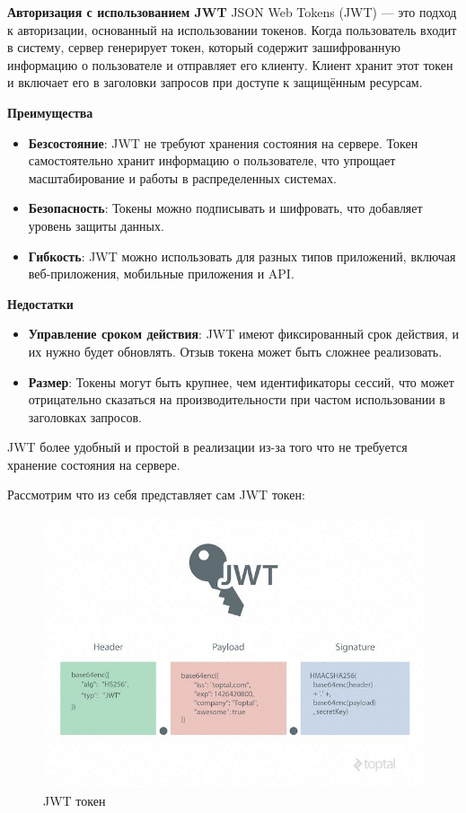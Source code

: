 \textbf{Авторизация с использованием JWT}
JSON Web Tokens (JWT) — это подход к авторизации, основанный на использовании токенов. Когда пользователь 
входит в систему, сервер генерирует токен, который содержит зашифрованную информацию о пользователе и отправляет 
его клиенту. Клиент хранит этот токен и включает его в заголовки запросов при доступе к защищённым ресурсам.

\textbf{Преимущества}
\begin{itemize}
    \item \textbf{Безсостояние}: JWT не требуют хранения состояния на сервере. Токен самостоятельно хранит информацию о пользователе, что упрощает масштабирование и работы в распределенных системах.
    \item \textbf{Безопасность}: Токены можно подписывать и шифровать, что добавляет уровень защиты данных.
    \item \textbf{Гибкость}: JWT можно использовать для разных типов приложений, включая веб-приложения, мобильные приложения и API.
\end{itemize}

\textbf{Недостатки}
\begin{itemize}
    \item \textbf{Управление сроком действия}: JWT имеют фиксированный срок действия, и их нужно будет обновлять. Отзыв токена может быть сложнее реализовать.
    \item \textbf{Размер}: Токены могут быть крупнее, чем идентификаторы сессий, что может отрицательно сказаться на производительности при частом использовании в заголовках запросов.
\end{itemize}

JWT более удобный и простой в реализации из-за того что не требуется хранение состояния на сервере.

Рассмотрим что из себя представляет сам JWT токен:

\begin{figure}[H]%
	\begin{center}
		\includegraphics[width=.6\columnwidth]{./img/new/jwt_token.png}%
	\end{center}
	\caption{JWT токен}%
	\label{pic:jwt_token}%
\end{figure}

